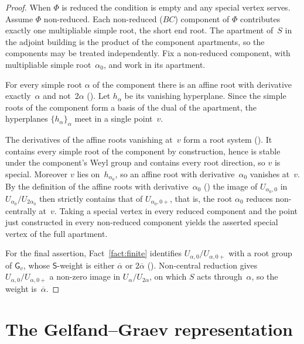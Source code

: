 \documentclass[11pt]{amsart}
\theoremstyle{definition}
\theoremstyle{remark}
\newcommand{\barr}[1]{\overline{#1}}
\begin{document}
\begin{proof}
When $\Phi$ is reduced the condition is empty and any special vertex serves. Assume $\Phi$ non-reduced. Each non-reduced ($BC$) component of $\Phi$ contributes exactly one multipliable simple root, the short end root. The apartment of~$S$ in the adjoint building is the product of the component apartments, so the components may be treated independently. Fix a non-reduced component, with multipliable simple root~$\alpha_0$, and work in its apartment.

For every simple root $\alpha$ of the component there is an affine root with derivative exactly~$\alpha$ and not~$2\alpha$ (\cite[\S\S 1.2, 1.6]{Tits}). Let $h_\alpha$ be its vanishing hyperplane. Since the simple roots of the component form a basis of the dual of the apartment, the hyperplanes $\{h_\alpha\}_\alpha$ meet in a single point~$v$.

The derivatives of the affine roots vanishing at~$v$ form a root system (\cite[Prop.~9.4.23]{KP}). It contains every simple root of the component by construction, hence is stable under the component's Weyl group and contains every root direction, so $v$ is special. Moreover $v$ lies on~$h_{\alpha_0}$, so an affine root with derivative~$\alpha_0$ vanishes at~$v$. By the definition of the affine roots with derivative~$\alpha_0$ (\cite[\S 1.6]{Tits}) the image of $U_{\alpha_0,0}$ in $U_{\alpha_0}/U_{2\alpha_0}$ then strictly contains that of $U_{\alpha_0,0+}$, that is, the root $\alpha_0$ reduces non-centrally at~$v$. Taking a special vertex in every reduced component and the point just constructed in every non-reduced component yields the asserted special vertex of the full apartment.

For the final assertion, Fact~\ref{fact:finite} identifies $U_{\alpha,0}/U_{\alpha,0+}$ with a root group of $\mathsf{G}_v$, whose $\mathsf{S}$-weight is either $\barr{\alpha}$ or $2\barr{\alpha}$ (\cite[Prop.~9.4.23]{KP}). Non-central reduction gives $U_{\alpha,0}/U_{\alpha,0+}$ a non-zero image in $U_\alpha/U_{2\alpha}$, on which $S$ acts through~$\alpha$, so the weight is~$\barr{\alpha}$.
\end{proof}


\section{The Gelfand--Graev representation}\label{sec:GG}
\end{document}

